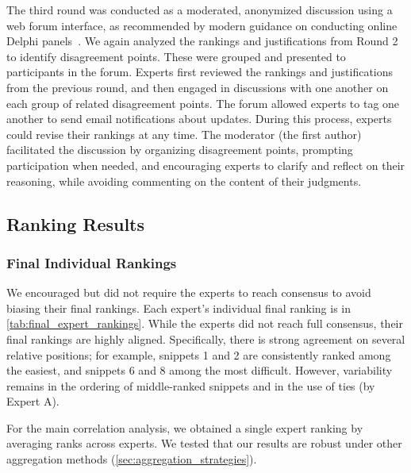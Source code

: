 The third round was conducted as a moderated, anonymized discussion using a web forum interface, as recommended by modern guidance on conducting online Delphi panels~\cite{randManual}.
We again analyzed the rankings and justifications from Round 2 to identify disagreement points. These were grouped and presented to participants in the forum. Experts first reviewed the rankings and justifications from the previous round, and then engaged in discussions with one another on each group of related disagreement points. The forum allowed experts to tag one another to send email notifications about updates.
During this process, experts could revise their rankings at any time. The moderator (the first author) facilitated the discussion by organizing disagreement points, prompting participation when needed, and encouraging experts to clarify and reflect on their reasoning, while avoiding commenting on the content of their judgments.

\subsection{Ranking Results}
\label{sec:final_rankings}

\subsubsection{Final Individual Rankings}

We encouraged but did not require the experts to reach consensus to avoid biasing their final rankings. 
Each expert's individual final ranking is in \cref{tab:final_expert_rankings}.
While the experts did not reach full consensus, their final rankings are highly aligned. Specifically, there is strong agreement on several relative positions; for example, snippets 1 and 2 are consistently ranked among the easiest, and snippets 6 and 8 among the most difficult. However, variability remains in the ordering of middle-ranked snippets and in the use of ties (by Expert A).

For the main correlation analysis, we obtained a single expert ranking by averaging ranks across experts. We tested that our results are robust under other aggregation methods (\cref{sec:aggregation_strategies}).

